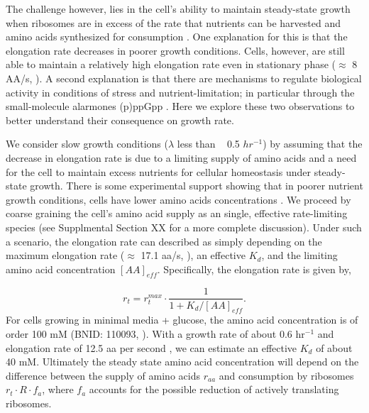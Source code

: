 The challenge however, lies in the cell's ability to maintain steady-state growth
when ribosomes are in excess of the rate that nutrients can be harvested and
amino  acids synthesized for consumption . One
explanation for this is that the elongation rate decreases in poorer growth
conditions. Cells, however, are still able to maintain a relatively high
elongation rate even in stationary phase ($\approx$ 8 AA/s, \citep{dai2016,
dai2018}). A second explanation is that there are mechanisms to
regulate biological activity in conditions of stress and nutrient-limitation; in
particular through the small-molecule alarmones (p)ppGpp \citep{harris2018}.
Here we explore these two observations to better understand
their consequence on growth rate.

We consider slow growth conditions ($\lambda$ less than ~ 0.5 $hr^{-1}$) by
assuming that the decrease in elongation rate is due to a
limiting supply of amino acids and a need for the cell to maintain excess
nutrients for cellular homeostasis under steady-state growth. There is some
experimental support showing that in poorer nutrient growth conditions, cells
have lower amino acids concentrations  \citep{bennett2009}. We proceed by coarse
graining the cell's amino acid supply as an single, effective rate-limiting
species (see Supplmental Section XX for a more complete discussion). Under such a scenario,
the elongation rate can described as simply depending on the maximum elongation
rate ($\approx$ 17.1 aa/s, \citep{dai2016, dai2018}), an effective $K_d$, and
the limiting amino acid concentration $[AA]_{eff}$. Specifically, the elongation
rate is given by,

\begin{equation}
r_t = r_t^{max} \cdot \frac{1}{1 + K_d / [AA]_{eff}}.
\label{eq:rate_Kd}
\end{equation}
For cells growing in minimal media + glucose, the amino acid concentration is of
order 100 mM  (BNID: 110093, \citep{milo2010, bennett2009}). With a growth rate
of about 0.6 hr$^{-1}$ and elongation rate of 12.5 aa per second
\citep{dai2016}, we can estimate an effective $K_d$ of about 40 mM. Ultimately
the steady state amino acid concentration will depend on the difference between
the supply of amino acids $r_{aa}$ and consumption by ribosomes $r_t \cdot R
\cdot f_a$, where $f_a$ accounts for the possible reduction of actively
translating ribosomes.

